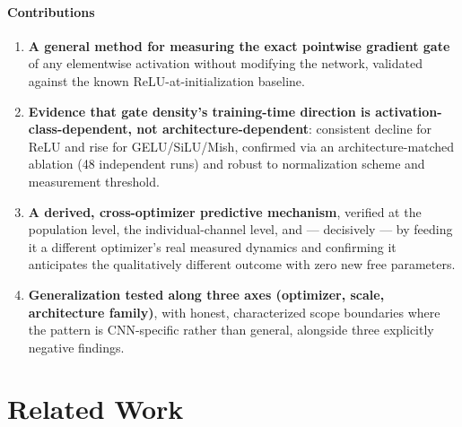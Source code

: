\documentclass{article}
\begin{document}
\paragraph{Contributions}
\begin{enumerate}[leftmargin=*,topsep=2pt,itemsep=2pt]
\item \textbf{A general method for measuring the exact pointwise gradient gate} of any elementwise activation without modifying the network, validated against the known ReLU-at-initialization baseline.
\item \textbf{Evidence that gate density's training-time direction is activation-class-dependent, not architecture-dependent}: consistent decline for ReLU and rise for GELU/SiLU/Mish, confirmed via an architecture-matched ablation (48 independent runs) and robust to normalization scheme and measurement threshold.
\item \textbf{A derived, cross-optimizer predictive mechanism}, verified at the population level, the individual-channel level, and --- decisively --- by feeding it a different optimizer's real measured dynamics and confirming it anticipates the qualitatively different outcome with zero new free parameters.
\item \textbf{Generalization tested along three axes (optimizer, scale, architecture family)}, with honest, characterized scope boundaries where the pattern is CNN-specific rather than general, alongside three explicitly negative findings.
\end{enumerate}

\section{Related Work}
\end{document}
